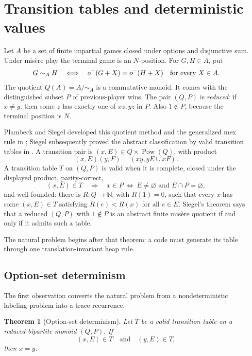 \documentclass[11pt]{article}
\newtheorem{theorem}{Theorem}[section]
\theoremstyle{definition}
\theoremstyle{remark}
\newcommand{\N}{\mathbb N}
\newcommand{\Pow}{\operatorname{Pow}}
\begin{document}
\section{Transition tables and deterministic values}\label{sec:tables}

Let $A$ be a set of finite impartial games closed under options and
disjunctive sum.  Under mis\`ere play the terminal game is an $N$-position.
For $G,H\in A$, put
\[
 G\sim_A H
 \quad\Longleftrightarrow\quad
 o^-(G+X)=o^-(H+X)\quad\hbox{for every }X\in A.
\]
The quotient $Q(A)=A/{\sim_A}$ is a commutative monoid.  It comes with the
distinguished subset $P$ of previous-player wins.  The pair $(Q,P)$ is
\emph{reduced}: if $x\ne y$, then some $z$ has exactly one of $xz,yz$ in
$P$.  Also $1\notin P$, because the terminal position is $N$.

Plambeck and Siegel developed this quotient method and the generalized mex
rule in \cite{plambecksiegel2008}; Siegel subsequently proved the abstract
classification by valid transition tables in \cite{siegel2007}.  A
transition pair is $(x,E)\in Q\times\Pow(Q)$, with product
\begin{equation}
 (x,E)(y,F)=(xy,yE\cup xF).
\end{equation}
A transition table $T$ on $(Q,P)$ is valid when it is complete, closed under
the displayed product, parity-correct,
\begin{equation}
 (x,E)\in T
 \quad\Longrightarrow\quad
 x\in P\ \Longleftrightarrow\ E\ne\varnothing\text{ and }E\cap P=\varnothing,
\end{equation}
and well-founded: there is $R:Q\to\N$, with $R(1)=0$, such that every
$x$ has some $(x,E)\in T$ satisfying $R(e)<R(x)$ for all $e\in E$.
Siegel's theorem says that a reduced $(Q,P)$ with $1\notin P$ is an abstract
finite mis\`ere quotient if and only if it admits such a table.

The natural problem begins after that theorem: a code must generate its table
through one translation-invariant heap rule.

\subsection{Option-set determinism}

The first observation converts the natural problem from a nondeterministic
labeling problem into a trace recurrence.

\begin{theorem}[Option-set determinism]\label{thm:determinism}
Let $T$ be a valid transition table on a reduced bipartite monoid $(Q,P)$.
If
\[
 (x,E)\in T\quad\text{and}\quad(y,E)\in T,
\]
then $x=y$.
\end{theorem}
\end{document}
